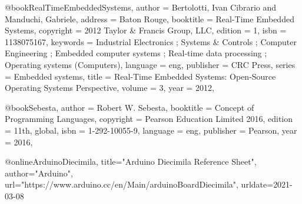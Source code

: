 @book{RealTimeEmbeddedSystems,
    author = {Bertolotti, Ivan Cibrario and Manduchi, Gabriele},
    address = {Baton Rouge},
    booktitle = {Real-Time Embedded Systems},
    copyright = {2012 Taylor & Francis Group, LLC},
    edition = {1},
    isbn = {1138075167},
    keywords = {Industrial Electronics ; Systems & Controls ; Computer Engineering ; Embedded computer systems ; Real-time data processing ; Operating systems (Computers)},
    language = {eng},
    publisher = {CRC Press},
    series = {Embedded systems},
    title = {Real-Time Embedded Systems: Open-Source Operating Systems Perspective},
    volume = {3},
    year = {2012},
}


@book{Sebesta,
    author = {Robert W. Sebesta},
    booktitle = {Concept of Programming Languages},
    copyright = {Pearson Education Limited 2016},
    edition = {11th, global},
    isbn = {1-292-10055-9},
    language = {eng},
    publisher = {Pearson},
    year = {2016},
}

@online{ArduinoDiecimila,
    title="Arduino Diecimila Reference Sheet",
    author="Arduino",
    url="https://www.arduino.cc/en/Main/arduinoBoardDiecimila",
    urldate={2021-03-08}
}
